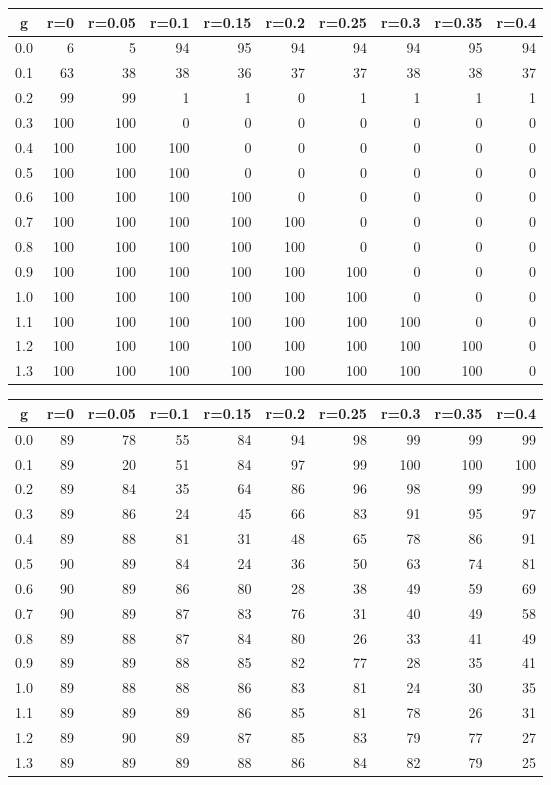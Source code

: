 %
\begin{table}[!tbp]
 \begin{center}
 \begin{tabular}{rrrrrrrrrr}\hline\hline
\multicolumn{1}{c}{g}&\multicolumn{1}{c}{r=0}&\multicolumn{1}{c}{r=0.05}&\multicolumn{1}{c}{r=0.1}&\multicolumn{1}{c}{r=0.15}&\multicolumn{1}{c}{r=0.2}&\multicolumn{1}{c}{r=0.25}&\multicolumn{1}{c}{r=0.3}&\multicolumn{1}{c}{r=0.35}&\multicolumn{1}{c}{r=0.4}\tabularnewline
\hline
0.0&  6&  5& 94& 95& 94& 94& 94& 95&94\tabularnewline
0.1& 63& 38& 38& 36& 37& 37& 38& 38&37\tabularnewline
0.2& 99& 99&  1&  1&  0&  1&  1&  1& 1\tabularnewline
0.3&100&100&  0&  0&  0&  0&  0&  0& 0\tabularnewline
0.4&100&100&100&  0&  0&  0&  0&  0& 0\tabularnewline
0.5&100&100&100&  0&  0&  0&  0&  0& 0\tabularnewline
0.6&100&100&100&100&  0&  0&  0&  0& 0\tabularnewline
0.7&100&100&100&100&100&  0&  0&  0& 0\tabularnewline
0.8&100&100&100&100&100&  0&  0&  0& 0\tabularnewline
0.9&100&100&100&100&100&100&  0&  0& 0\tabularnewline
1.0&100&100&100&100&100&100&  0&  0& 0\tabularnewline
1.1&100&100&100&100&100&100&100&  0& 0\tabularnewline
1.2&100&100&100&100&100&100&100&100& 0\tabularnewline
1.3&100&100&100&100&100&100&100&100& 0\tabularnewline
\hline
\end{tabular}

\end{center}

\end{table}

%
\begin{table}[!tbp]
 \begin{center}
 \begin{tabular}{rrrrrrrrrr}\hline\hline
\multicolumn{1}{c}{g}&\multicolumn{1}{c}{r=0}&\multicolumn{1}{c}{r=0.05}&\multicolumn{1}{c}{r=0.1}&\multicolumn{1}{c}{r=0.15}&\multicolumn{1}{c}{r=0.2}&\multicolumn{1}{c}{r=0.25}&\multicolumn{1}{c}{r=0.3}&\multicolumn{1}{c}{r=0.35}&\multicolumn{1}{c}{r=0.4}\tabularnewline
\hline
0.0&89&78&55&84&94&98& 99& 99& 99\tabularnewline
0.1&89&20&51&84&97&99&100&100&100\tabularnewline
0.2&89&84&35&64&86&96& 98& 99& 99\tabularnewline
0.3&89&86&24&45&66&83& 91& 95& 97\tabularnewline
0.4&89&88&81&31&48&65& 78& 86& 91\tabularnewline
0.5&90&89&84&24&36&50& 63& 74& 81\tabularnewline
0.6&90&89&86&80&28&38& 49& 59& 69\tabularnewline
0.7&90&89&87&83&76&31& 40& 49& 58\tabularnewline
0.8&89&88&87&84&80&26& 33& 41& 49\tabularnewline
0.9&89&89&88&85&82&77& 28& 35& 41\tabularnewline
1.0&89&88&88&86&83&81& 24& 30& 35\tabularnewline
1.1&89&89&89&86&85&81& 78& 26& 31\tabularnewline
1.2&89&90&89&87&85&83& 79& 77& 27\tabularnewline
1.3&89&89&89&88&86&84& 82& 79& 25\tabularnewline
\hline
\end{tabular}

\end{center}

\end{table}

